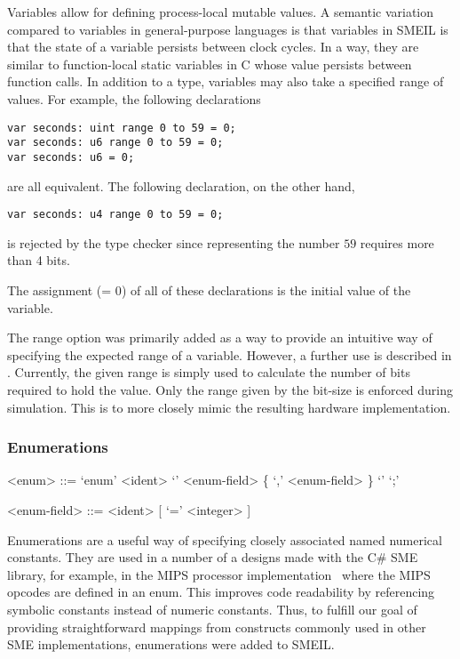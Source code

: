 Variables allow for defining process-local mutable values. A semantic variation
compared to variables in general-purpose languages is that variables in SMEIL
is that the state of a variable persists between clock cycles. In a way, they
are similar to function-local {\ttfamily static} variables in C whose value
persists between function calls. In addition to a type, variables may also take
a specified {\ttfamily range} of values. For example, the following declarations
\begin{lstlisting}[language=smeil]
var seconds: uint range 0 to 59 = 0;
var seconds: u6 range 0 to 59 = 0;
var seconds: u6 = 0;
\end{lstlisting}
are all equivalent. The following declaration, on the other hand,
\begin{lstlisting}[language=smeil]
var seconds: u4 range 0 to 59 = 0;
\end{lstlisting}
is rejected by the type checker since representing the number $59$ requires more
than 4 bits.

The assignment ({\ttfamily = 0}) of all of these declarations is the initial
value of the variable.

The {\ttfamily range} option was primarily added as a way to provide an
intuitive way of specifying the expected range of a variable. However, a further
use is described in . Currently, the given range is simply used
to calculate the number of bits required to hold the value. Only the range given
by the bit-size is enforced during simulation. This is to more closely mimic the
resulting hardware implementation.

\subsubsection{Enumerations}
\begin{grammar}
<enum> ::= `enum' <ident> `{' <enum-field> \{ `,' <enum-field>  \} `}' `;'

<enum-field> ::= <ident> [ `=' <integer> ]
\end{grammar}

Enumerations are a useful way of specifying closely associated named numerical
constants. They are used in a number of a designs made with the C\# SME library,
for example, in the MIPS processor implementation~\cite{johnsen2017thesis} where
the MIPS opcodes are defined in an {\ttfamily enum}. This improves code
readability by referencing symbolic constants instead of numeric
constants. Thus, to fulfill our goal of providing straightforward mappings from
constructs commonly used in other SME implementations, enumerations were added
to SMEIL.

